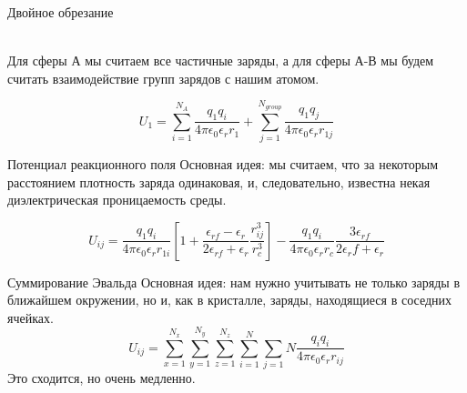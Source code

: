 \begin{frame}{Двойное обрезание}

    \centering{}
    \\
    
Для сферы А мы считаем все частичные заряды, а для сферы А-В мы будем считать взаимодействие групп зарядов с нашим атомом.
		
\[ U_1= \sum_{i=1}^{N_A}  \frac{q_1 q_i}{4 \pi \epsilon_0 \epsilon_r r_{1} } + 
\sum_{j=1}^{N_{group}}  \frac{q_1 q_j}{4 \pi \epsilon_0 \epsilon_r r_{1j} }  \]

\end{frame}

\begin{frame}{Потенциал реакционного поля}
Основная идея: мы считаем, что за некоторым расстоянием плотность заряда одинаковая, и, следовательно, известна некая
диэлектрическая проницаемость среды.\\
\vspace{0.5cm}

\[ U_{ij}=   \frac{q_1 q_i}{4\pi \epsilon_0 \epsilon_r r_{1i}}  \left [ 1 + \frac{ \epsilon_{rf} - \epsilon_r}{ 2\epsilon_{rf} + 
\epsilon_r}\frac{r_{ij}^3}{ r_c^3} \right ] - \frac{q_1 q_i}{4\pi \epsilon_0 \epsilon_r r_c}\frac{3\epsilon_{rf}}{ 2
\epsilon_rf + \epsilon_r}  \]
\end{frame}


\begin{frame}{Суммирование Эвальда}{}
Основная идея: нам нужно учитывать не только заряды в ближайшем окружении, но и, как в кристалле, заряды, находящиеся в соседних ячейках.\\
\[ U_{ij}=  \sum_{x=1}^{N_x} \sum_{y=1}^{N_y} \sum_{z=1}^{N_z} \sum_{i=1}^{N} \sum_{j=1}{N}{\frac{q_i q_i}{4\pi \epsilon_0 \epsilon_r r_{ij}}} \]
Это сходится, но очень медленно.
\end{frame}

